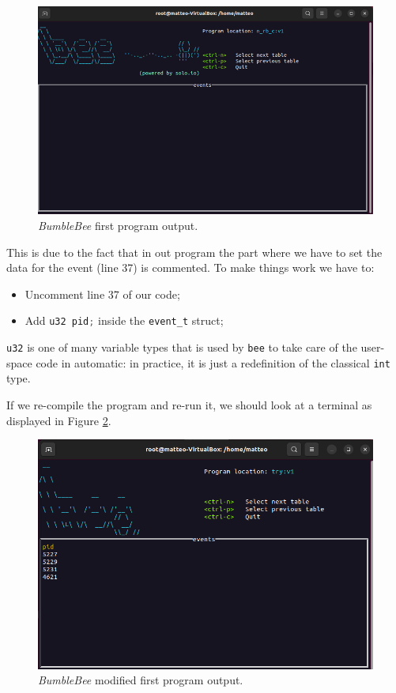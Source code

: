 \begin{figure}[h]
	\centering
	\includegraphics[width=0.7\linewidth]{images/LinuxDevelopment/n_rb_p_display.png}
	\caption{\textit{BumbleBee} first program output.}
	\label{fig:bee_first_program_output}
\end{figure}

This is due to the fact that in out program the part where we have to set the data for the event (line 37) is commented.
To make things work we have to:

\begin{itemize}
	\item Uncomment line 37 of our code;
	\item Add \lstinline[language=C]|u32 pid;| inside the \verb|event_t| struct;
\end{itemize}

\verb|u32| is one of many variable types that is used by \verb|bee| to take care of the user-space code in automatic: in practice, it is just a redefinition of the classical \verb|int| type.

If we re-compile the program and re-run it, we should look at a terminal as displayed in Figure \ref{fig:bee_modified_first_program_output}.

\begin{figure}[h]
	\centering
	\includegraphics[width=0.7\linewidth]{images/LinuxDevelopment/n_rb_p_working_display.png}
	\caption{\textit{BumbleBee} modified first program output.}
	\label{fig:bee_modified_first_program_output}
\end{figure}

